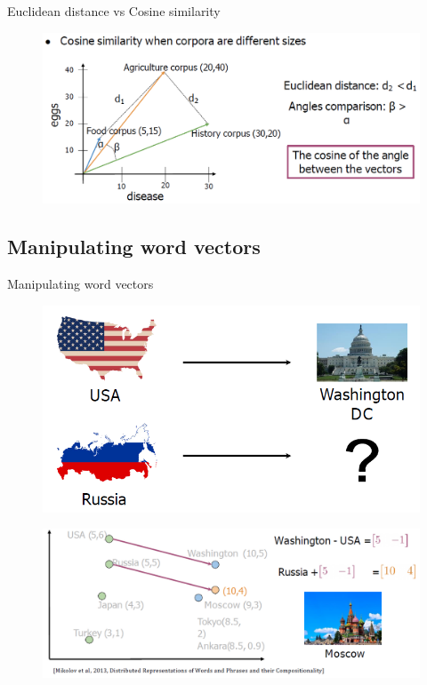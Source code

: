 \begin{frame}{Euclidean distance vs Cosine similarity}
    \begin{figure}
        \centering
        \includegraphics[width=\textwidth,height=0.8\textheight,keepaspectratio]{images/vector-space/euclidean-vs-cosine.png}
    \end{figure}
\end{frame}

\subsection{Manipulating word vectors}
\begin{frame}[allowframebreaks]{Manipulating word vectors}
    \begin{figure}
        \centering
        \includegraphics[width=\textwidth,height=0.65\textheight,keepaspectratio]{images/vector-space/manipulate-word-vec-1.png}
    \end{figure}
\framebreak
    \begin{figure}
        \centering
        \includegraphics[width=\textwidth,height=0.8\textheight,keepaspectratio]{images/vector-space/manipulate-word-vec-2.png}
    \end{figure}
\end{frame}

